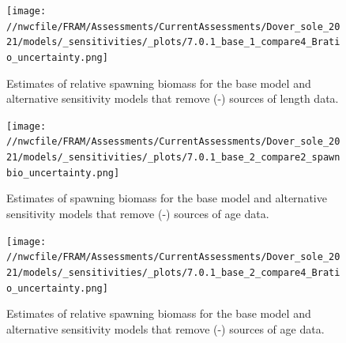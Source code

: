 \documentclass[11pt,
  english,
  a4paper,
]{article}
\begin{document}
\tagmcend\tagstructend


\begin{figure}
\centering
\texttt{[image: //nwcfile/FRAM/Assessments/CurrentAssessments/Dover\_sole\_2021/models/\_sensitivities/\_plots/7.0.1\_base\_1\_compare4\_Bratio\_uncertainty.png]}
\caption{Estimates of relative spawning biomass for the base model and alternative sensitivity models that remove (-) sources of length data.\label{fig:sens-length-relssb}}
\end{figure}

\tagmcend\tagstructend


\begin{figure}
\centering
\texttt{[image: //nwcfile/FRAM/Assessments/CurrentAssessments/Dover\_sole\_2021/models/\_sensitivities/\_plots/7.0.1\_base\_2\_compare2\_spawnbio\_uncertainty.png]}
\caption{Estimates of spawning biomass for the base model and alternative sensitivity models that remove (-) sources of age data.\label{fig:sens-age-ssb}}
\end{figure}

\tagmcend\tagstructend


\begin{figure}
\centering
\texttt{[image: //nwcfile/FRAM/Assessments/CurrentAssessments/Dover\_sole\_2021/models/\_sensitivities/\_plots/7.0.1\_base\_2\_compare4\_Bratio\_uncertainty.png]}
\caption{Estimates of relative spawning biomass for the base model and alternative sensitivity models that remove (-) sources of age data.\label{fig:sens-age-relssb}}
\end{figure}

\tagmcend\tagstructend

\end{document}
